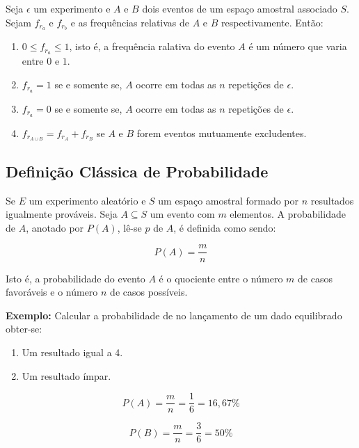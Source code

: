 \inic Seja $\epsilon$ um experimento e $A$ e $B$ dois eventos de um espaço amostral associado $S$. Sejam $f_{r}_{a}$ e $f_{r}_{b}$ e as frequências relativas de $A$ e $B$ respectivamente. Então:

\begin{enumerate}
    \item $0 \leqslant f_{r_{a}}  \leqslant 1$, isto é, a frequência ralativa do evento $A$ é um número que varia entre $0$ e $1$.
    \item $f_{r_{a}}= 1$ se e somente se, $A$ ocorre em todas as $n$ repetições de $\epsilon$.
    \item $f_{r_{a}}= 0$ se e somente se, $A$ ocorre em todas as $n$ repetições de $\epsilon$.
    \item $f_{r_{A \cup B}}  = f_{r_{A}} + f_{r_{B}}$ se $A$ e $B$ forem eventos mutuamente excludentes.
\end{enumerate}
 
 
 
 
 
\subsection{Definição Clássica de Probabilidade}
 
\inic Se $E$ um experimento aleatório e $S$ um espaço amostral formado por $n$ resultados igualmente prováveis. Seja $A \subseteq S$ um evento com $m$ elementos. A probabilidade de $A$, anotado por $P(A)$, lê-se $p$ de $A$, é definida como sendo:
  
\begin{equation}
     P(A)= \frac{m}{n}
\end{equation}
  
\inic Isto é, a probabilidade do evento $A$ é o quociente entre o número $m$ de casos favoráveis e o número $n$ de casos possíveis.\vskip0.3cm


\textbf{Exemplo:} Calcular a probabilidade de no lançamento de um
dado equilibrado obter-se:

\begin{enumerate}
    \item Um resultado igual a 4.
    \item Um resultado ímpar.
\end{enumerate}

$$
P(A)= \frac{m}{n}=\frac{1}{6}=16,67\%
$$

$$
P(B)= \frac{m}{n}=\frac{3}{6}=50\%
$$





